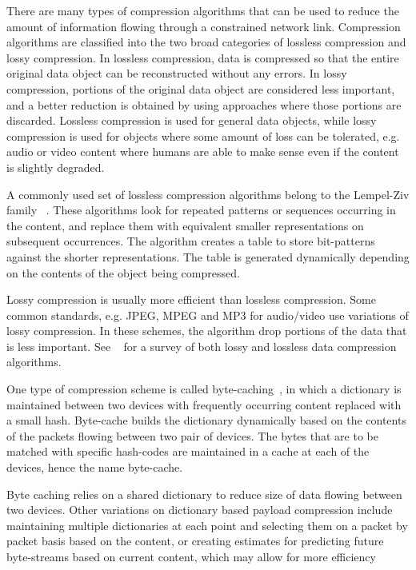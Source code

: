 There are many types of compression algorithms that can be used to reduce the amount of information flowing through a constrained network link.  Compression algorithms are classified into the two broad categories of lossless compression and lossy compression. In lossless compression, data is compressed so that the entire original data object can be reconstructed without any errors. In lossy compression, portions of the original data object are considered less important, and a better reduction is obtained by using approaches where those portions are discarded. Lossless compression is used for general data objects, while lossy compression is used for objects where some amount of loss can be tolerated, e.g. audio or video content where humans are able to make sense even if the content is slightly degraded. 

A commonly used set of lossless compression algorithms belong to the Lempel-Ziv family ~\cite{ziv1977universal, ziv1978compression}. These algorithms look for repeated patterns or sequences occurring in the content, and replace them with equivalent smaller representations on subsequent occurrences. The algorithm creates a table to store bit-patterns against the shorter representations. The table is generated dynamically depending on the contents of the object being compressed.

Lossy compression is usually more efficient than lossless compression. Some common standards, e.g. JPEG, MPEG and MP3 for audio/video use variations of lossy compression. In these schemes, the algorithm drop portions of the  data that is less important. See ~\cite{david2004data, sayood2017introduction} for a survey of both lossy and lossless data compression algorithms. 

One type of compression scheme is called byte-caching~\cite{le2012byte}, in which a dictionary is maintained between two devices with frequently occurring content replaced with a small  hash. Byte-cache builds the dictionary dynamically based on the contents of the packets  flowing between two pair of devices. The bytes that are to be matched with specific hash-codes are maintained in a cache at each of the devices, hence the name byte-cache. 

Byte caching relies on a shared dictionary to reduce size of data flowing between two devices. Other variations on dictionary based payload compression include maintaining multiple dictionaries at each point and selecting them on a packet by packet basis based on the content, or creating estimates for predicting future byte-streams based on current content, which may allow for more efficiency

